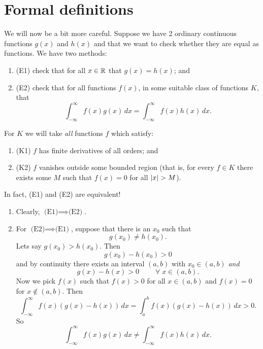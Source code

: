 \section{Formal definitions}

We will now be a bit more careful.
Suppose we have 2 ordinary continuous functions $g(x)$ and $h(x)$ and
that we want to check whether they are equal as functions.
We have two methods:
\begin{enumerate}
    \item (E1) check that for all $x \in \mathbb{R}$ that $g(x) = h(x)$; and
    \item (E2) check that for all functions $f(x)$, 
        in some suitable class of functions $K$,
        that 
        \[
            \int_{-\infty}^{\infty} f(x) g(x) \,dx 
            = \int_{-\infty}^{\infty} f(x) h(x) \,dx.
        \]
\end{enumerate}

For $K$ we will take \emph{all} functions $f$ which satisfy:
\begin{enumerate}
    \item (K1) $f$ has finite derivatives of all orders; and
    \item (K2) $f$ vanishes outside some bounded region
        (that is, for every $f \in K$ there exists some $M$ 
        such that $f(x) = 0$ for all $\left\lvert x\right\rvert > M$).
\end{enumerate}

In fact, (E1) and (E2) are equivalent!
\begin{enumerate}
    \item Clearly, $\text{(E1)} \implies \text{(E2)}$.
    \item For $\text{(E2)} \implies \text{(E1)}$,
        suppose that there is an $x_0$ such that
        \[
            g(x_0) \neq h(x_0).
        \]
        Lets say $g(x_0) > h(x_0)$.
        Then 
        \[
            g(x_0) - h(x_0) > 0
        \]
        and by continuity there exists an interval $(a,b)$ with $x_0 \in (a,b)$
        \emph{and}
        \[
            g(x) - h(x) > 0 \qquad \;\forall\; x \in (a,b).
        \]
        Now we pick $f(x)$ such that $f(x) > 0$ for all $x \in (a,b)$
        and $f(x) = 0$ for $x \not\in (a,b)$.
        Then
        \[
            \int_{-\infty}^{\infty} f(x) (g(x) - h(x)) \,dx
            = \int_{a}^{b} f(x) (g(x) - h(x)) \,dx > 0.
        \]
        So
        \[
            \int_{-\infty}^{\infty} f(x) g(x) \,dx
            \neq \int_{-\infty}^{\infty} f(x) h(x) \,dx.
        \]
\end{enumerate}

